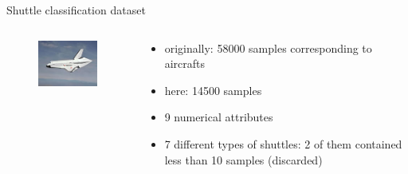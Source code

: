 \documentclass[english]{beamer}
\begin{document}
\begin{frame}{Shuttle classification dataset}
	\begin{columns}
		\begin{column}{0.35\textwidth}
			\begin{figure}
				\centering
				\includegraphics[scale=0.75]{figures/shuttle.jpg}
			\end{figure}
		\end{column}
		
		\begin{column}{0.65\textwidth}
			\begin{itemize}
				\item originally: 58000 samples corresponding to aircrafts
				\item here: 14500 samples
				\item 9 numerical attributes
				\item 7 different types of shuttles: 2 of them contained less than 10 samples (discarded)
			\end{itemize}
		\end{column}
	\end{columns}
\end{frame}
\end{document}

